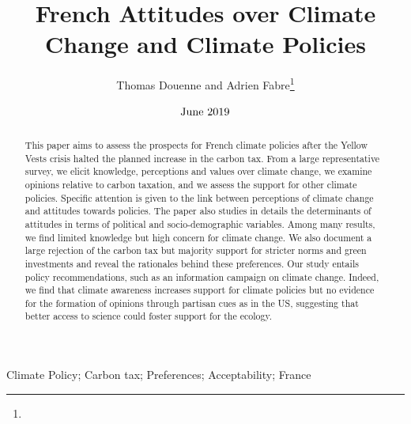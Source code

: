 \documentclass[english,5p,authoryear]{elsarticle}
\begin{document}
\sloppy

\date{$\textnormal{June 2019}$}

\begin{frontmatter}{}
  \title{French Attitudes over Climate Change and Climate Policies
  }
  
\author{Thomas Douenne and Adrien Fabre\footnote{}} 

{}

\begin{abstract}
This paper aims to assess the prospects for French climate policies after the Yellow Vests crisis halted the planned increase in the carbon tax. From a large representative survey, we elicit knowledge, perceptions and values over climate change, we examine opinions relative to carbon taxation, and we assess the support for other climate policies. Specific attention is given to the link between perceptions of climate change and attitudes towards policies. The paper also studies in details the determinants of attitudes in terms of political and socio-demographic variables. Among many results, we find limited knowledge but high concern for climate change. We also document a large rejection of the carbon tax but majority support for stricter norms and green investments and reveal the rationales behind these preferences. Our study entails policy recommendations, such as an information campaign on climate change. Indeed, we find that climate awareness increases support for climate policies but no evidence for the formation of opinions through partisan cues as in the US, suggesting that better access to science could foster support for the ecology.
\end{abstract} %




\begin{keyword}
Climate Policy; Carbon tax; Preferences; Acceptability; France 
\end{keyword}
\end{frontmatter}{}
\end{document}
